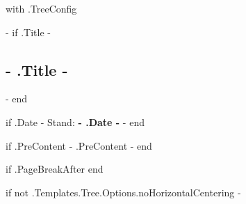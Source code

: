 {{ with .TreeConfig }}

    {{- if .Title -}}
    \subsection{ {{- .Title -}} }
    {{- end }}

    {{ if .Date -}}
    Stand: \textbf{ {{- .Date -}} }
    {{- end }}


    {{ if .PreContent -}}
    {{ .PreContent }}
    {{- end }}


    {{ if .PageBreakAfter }}
        \vfill
    {{ end }}

    {{ if not .Templates.Tree.Options.noHorizontalCentering -}}
